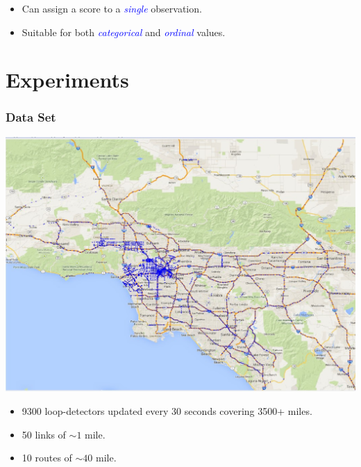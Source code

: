\documentclass[t]{beamer}
\begin{document}
\begin{frame}
\begin{itemize}
\begin{itemize}
\item<4-> Can assign a score to a \textcolor{blue}{\emph{single}} observation.
\item<4-> Suitable for both \textcolor{blue}{\emph{categorical}} and \textcolor{blue}{\emph{ordinal}} values.
\end{itemize}
\end{itemize}
\end{frame}

\section{Experiments}

\begin{frame}\frametitle{Data Set}
\vspace{-0.25in}
\begin{center}
	\includegraphics[scale=0.4]{LA-map.jpg}
\end{center}
\begin{itemize}
\item 9300 loop-detectors updated every 30 seconds covering 3500+ miles.
\item<2-> 50 links of $\sim 1$ mile.
\item<3-> 10 routes of $\sim 40$ mile.
\end{itemize}
\end{frame}
\end{document}

